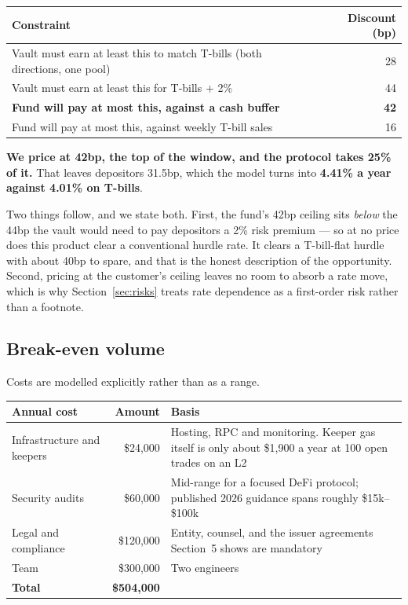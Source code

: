 \documentclass[11pt,a4paper]{article}
\begin{document}
\begin{center}
\begin{tabular}{@{}p{8.6cm}r@{}}
\toprule
\textbf{Constraint} & \textbf{Discount (bp)} \\
\midrule
Vault must earn at least this to match T-bills (both directions, one pool) & 28 \\
Vault must earn at least this for T-bills $+$ 2\% & 44 \\
\textbf{Fund will pay at most this, against a cash buffer} & \textbf{42} \\
Fund will pay at most this, against weekly T-bill sales & 16 \\
\bottomrule
\end{tabular}
\end{center}

\textbf{We price at 42bp, the top of the window, and the protocol takes 25\% of it.} That leaves
depositors 31.5bp, which the model turns into \textbf{4.41\% a year against 4.01\% on T-bills}.

Two things follow, and we state both. First, the fund's 42bp ceiling sits \emph{below} the 44bp the
vault would need to pay depositors a 2\% risk premium — so at no price does this product clear a
conventional hurdle rate. It clears a T-bill-flat hurdle with about 40bp to spare, and that is the
honest description of the opportunity. Second, pricing at the customer's ceiling leaves no room to
absorb a rate move, which is why Section~\ref{sec:risks} treats rate dependence as a first-order
risk rather than a footnote.

\subsection{Break-even volume}

Costs are modelled explicitly rather than as a range.

\begin{center}
\begin{tabular}{@{}lrp{7.2cm}@{}}
\toprule
\textbf{Annual cost} & \textbf{Amount} & \textbf{Basis} \\
\midrule
Infrastructure and keepers & \$24{,}000 & Hosting, RPC and monitoring. Keeper gas itself is only about \$1{,}900 a year at 100 open trades on an L2 \\
Security audits & \$60{,}000 & Mid-range for a focused DeFi protocol; published 2026 guidance spans roughly \$15k--\$100k \cite{sherlock} \\
Legal and compliance & \$120{,}000 & Entity, counsel, and the issuer agreements Section~5 shows are mandatory \\
Team & \$300{,}000 & Two engineers \\
\midrule
\textbf{Total} & \textbf{\$504{,}000} & \\
\bottomrule
\end{tabular}
\end{center}
\end{document}
